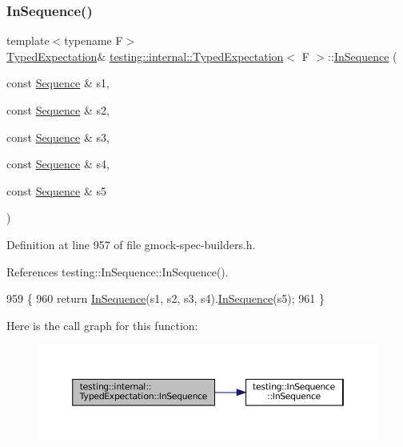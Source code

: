 \subsubsection{\texorpdfstring{In\+Sequence()}{InSequence()}\hspace{0.1cm}{\footnotesize\ttfamily [5/5]}}
{\footnotesize\ttfamily template$<$typename F$>$ \\
\hyperlink{classtesting_1_1internal_1_1TypedExpectation}{Typed\+Expectation}\& \hyperlink{classtesting_1_1internal_1_1TypedExpectation}{testing\+::internal\+::\+Typed\+Expectation}$<$ F $>$\+::\hyperlink{classtesting_1_1InSequence}{In\+Sequence} (\begin{DoxyParamCaption}\item[{const \hyperlink{classtesting_1_1Sequence}{Sequence} \&}]{s1,  }\item[{const \hyperlink{classtesting_1_1Sequence}{Sequence} \&}]{s2,  }\item[{const \hyperlink{classtesting_1_1Sequence}{Sequence} \&}]{s3,  }\item[{const \hyperlink{classtesting_1_1Sequence}{Sequence} \&}]{s4,  }\item[{const \hyperlink{classtesting_1_1Sequence}{Sequence} \&}]{s5 }\end{DoxyParamCaption})\hspace{0.3cm}{\ttfamily [inline]}}



Definition at line 957 of file gmock-\/spec-\/builders.\+h.



References testing\+::\+In\+Sequence\+::\+In\+Sequence().


\begin{DoxyCode}
959                                                    \{
960     \textcolor{keywordflow}{return} \hyperlink{classtesting_1_1internal_1_1TypedExpectation_ada9e9081a98435991310ac60483d1230}{InSequence}(s1, s2, s3, s4).\hyperlink{classtesting_1_1internal_1_1TypedExpectation_ada9e9081a98435991310ac60483d1230}{InSequence}(s5);
961   \}
\end{DoxyCode}
Here is the call graph for this function\+:
\nopagebreak
\begin{figure}[H]
\begin{center}
\leavevmode
\includegraphics[width=350pt]{classtesting_1_1internal_1_1TypedExpectation_ad8775f8ba9965d1836f6e4c09baf1c3e_cgraph}
\end{center}
\end{figure}
\mbox{\label{classtesting_1_1internal_1_1TypedExpectation_ad1a18c39511a2f6fda425881cddcc31a}} 
